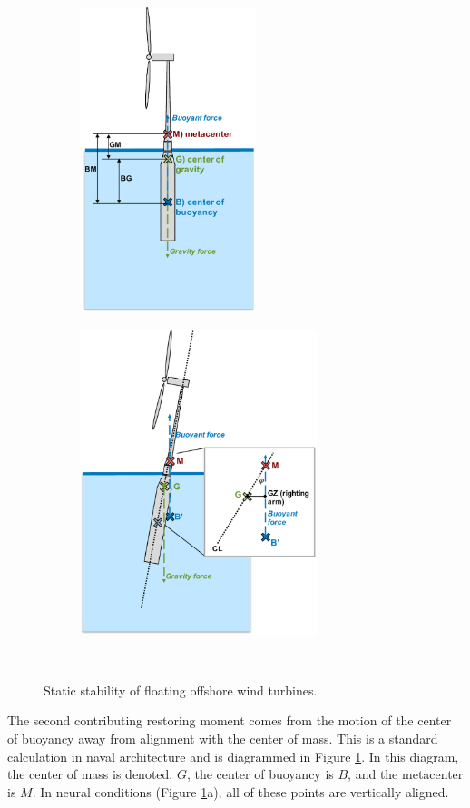 \begin{figure}[htb]
  \begin{subfigure}[b]{0.49\linewidth}
    \centering \includegraphics[height=3.5in]{figs/metacenterA.pdf}
    \caption{}
  \end{subfigure}
  \begin{subfigure}[b]{0.49\linewidth}
    \centering \includegraphics[height=3.5in]{figs/metacenterB.pdf}
    \caption{}
  \end{subfigure}\\
  \caption{Static stability of floating offshore wind turbines.}
  \label{fig:metacenter}
\end{figure}

The second contributing restoring moment comes from the motion of the
center of buoyancy away from alignment with the center of mass.  This is
a standard calculation in naval architecture \citep{thiagarajan2014} and is
diagrammed in Figure \ref{fig:metacenter}.  In this diagram, the center
of mass is denoted, $G$, the center of buoyancy is $B$, and the
metacenter is $M$.  In neural conditions (Figure \ref{fig:metacenter}a),
all of these points are vertically aligned.

